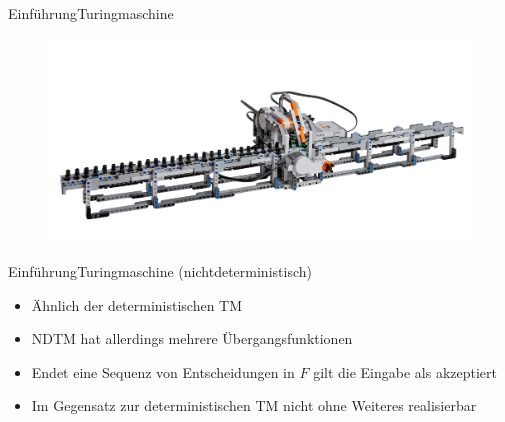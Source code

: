 \documentclass[ignorenonframetext,]{beamer}
\begin{document}
\begin{frame}{Einführung}{Turingmaschine}

\begin{figure}[htbp]
\centering
\includegraphics{img/lego_tm.png}

\end{figure}
\end{frame}
\begin{frame}{Einführung}{Turingmaschine (nichtdeterministisch)}

\begin{itemize}
\itemsep1pt\parskip0pt
\item
  Ähnlich der deterministischen TM
\item
  NDTM hat allerdings mehrere Übergangsfunktionen
\item
  Endet eine Sequenz von Entscheidungen in $F$ gilt die Eingabe als
  akzeptiert
\item
  Im Gegensatz zur deterministischen TM nicht ohne Weiteres realisierbar
\end{itemize}

\end{frame}
\end{document}
